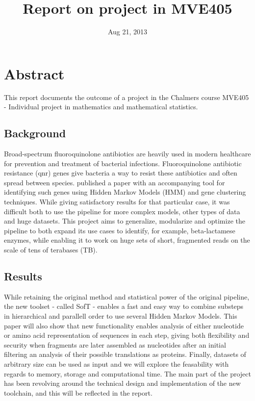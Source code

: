 \documentclass[a4paper,12pt]{article}
\title {Report on project in MVE405}
\date {Aug 21, 2013}
\begin{document}
\maketitle

\section{Abstract}
This report documents the outcome of a project in the Chalmers course MVE405 - Individual project in mathematics and mathematical statistics.

\subsection{Background}
Broad-spectrum fluoroquinolone antibiotics are heavily used in modern healthcare for prevention and treatment of bacterial infections. Fluoroquinolone antibiotic resistance (qnr) genes give bacteria a way to resist these antibiotics and often spread between species. \textcite{Boulund}  published a paper with an accompanying tool for identifying such genes using Hidden Markov Models (HMM) and gene clustering techniques. While giving satisfactory results for that particular case, it was difficult both to use the pipeline for more complex models, other types of data and huge datasets. This project aims to generalize, modularize and optimize the pipeline to both expand its use cases to identify, for example, beta-lactamese enzymes, while enabling it to work on huge sets of short, fragmented reads on the scale of tens of terabases (TB).

\subsection{Results}
While retaining the original method and statistical power of the original pipeline, the new toolset - called SofT - enables a fast and easy way to combine substeps in hierarchical and parallell order to use several Hidden Markov Models. This paper will also show that new functionality enables analysis of either nucleotide or amino acid representation of sequences in each step, giving both flexibility and security when fragments are later assembled as nucleotides after an initial filtering an analysis of their possible translations as proteins. Finally, datasets of arbitrary size can be used as input and we will explore the feasability with regards to memory, storage and computational time. The main part of the project has been revolving around the technical design and implementation of the new toolchain, and this will be reflected in the report.
\end{document}
